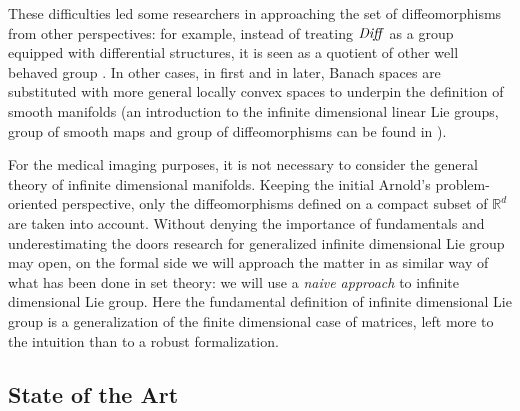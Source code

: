 These difficulties led some researchers in approaching the set of diffeomorphisms from other perspectives: 
for example, instead of treating $\text{\emph{Diff}}$ as a group equipped with differential structures, it is seen as a quotient of other well behaved group \cite{wojtynski1994one}. In other cases, in \cite{marsden1970hamiltonian} first and in \cite{milnor1984remarks} later, Banach spaces are substituted with more general locally convex spaces to underpin the definition of smooth manifolds (an introduction to the infinite dimensional linear Lie groups, group of smooth maps and group of diffeomorphisms can be found in \cite{neeb2006infinite}).

For the medical imaging purposes, it is not necessary to consider the general theory of infinite dimensional manifolds. Keeping the initial Arnold's problem-oriented perspective, only the diffeomorphisms defined on a compact subset of $\mathbb{R}^d$ are taken into account. Without denying the importance of fundamentals and underestimating the doors research for generalized infinite dimensional Lie group may open, on the formal side we will approach the matter in as similar way of what has been done in set theory: we will use a \emph{naive approach} to infinite dimensional Lie group. Here the fundamental definition of infinite dimensional Lie group is a generalization of the finite dimensional case of matrices, left more to the intuition than to a robust formalization. 

\subsection{State of the Art}\label{se:state_of_the_art}

